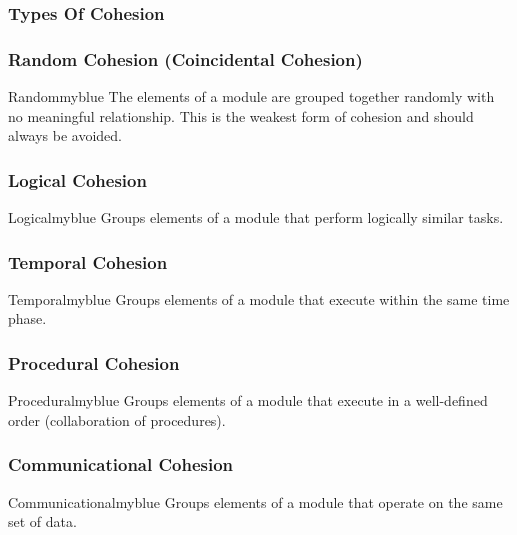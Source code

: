 \subsubsection{Types Of Cohesion}

\subsubsection*{Random Cohesion (Coincidental Cohesion)}
\begin{prettyBox}{Random}{myblue}
The elements of a module are grouped together randomly with no meaningful
relationship. This is the weakest form of cohesion and should always be avoided.
\end{prettyBox}

\vspace{0.25cm}

\subsubsection*{Logical Cohesion}
\begin{prettyBox}{Logical}{myblue}
Groups elements of a module that perform logically similar tasks.
\end{prettyBox}

\newpage
\null
\subsubsection*{Temporal Cohesion}
\begin{prettyBox}{Temporal}{myblue}
Groups elements of a module that execute within the same time phase.
\end{prettyBox}

\vspace{0.25cm}

\subsubsection*{Procedural Cohesion}
\begin{prettyBox}{Procedural}{myblue}
Groups elements of a module that execute in a well-defined order (collaboration of procedures).
\end{prettyBox}

\vspace{0.25cm}

\subsubsection*{Communicational Cohesion}
\begin{prettyBox}{Communicational}{myblue}
Groups elements of a module that operate on the same set of data.
\end{prettyBox}


